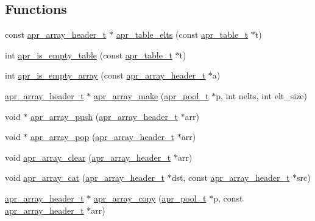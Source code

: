\subsection*{Functions}
\begin{DoxyCompactItemize}
\item 
const \hyperlink{structapr__array__header__t}{apr\-\_\-array\-\_\-header\-\_\-t} $\ast$ \hyperlink{group__apr__tables_gaea3005541cce67481f48ab201b5c0cf3}{apr\-\_\-table\-\_\-elts} (const \hyperlink{group__apr__tables_gad7ea82d6608a4a633fc3775694ab71e4}{apr\-\_\-table\-\_\-t} $\ast$t)
\item 
int \hyperlink{group__apr__tables_ga198e52683a86ecf8df9642990c220ff7}{apr\-\_\-is\-\_\-empty\-\_\-table} (const \hyperlink{group__apr__tables_gad7ea82d6608a4a633fc3775694ab71e4}{apr\-\_\-table\-\_\-t} $\ast$t)
\item 
int \hyperlink{group__apr__tables_gacae19f5b2182d5813f4ef3050f82ff29}{apr\-\_\-is\-\_\-empty\-\_\-array} (const \hyperlink{structapr__array__header__t}{apr\-\_\-array\-\_\-header\-\_\-t} $\ast$a)
\item 
\hyperlink{structapr__array__header__t}{apr\-\_\-array\-\_\-header\-\_\-t} $\ast$ \hyperlink{group__apr__tables_ga8f4308b5a1636ec06544113a9c283304}{apr\-\_\-array\-\_\-make} (\hyperlink{group__apr__pools_gaf137f28edcf9a086cd6bc36c20d7cdfb}{apr\-\_\-pool\-\_\-t} $\ast$p, int nelts, int elt\-\_\-size)
\item 
void $\ast$ \hyperlink{group__apr__tables_gac08267b32905197dd02ffff3314d9603}{apr\-\_\-array\-\_\-push} (\hyperlink{structapr__array__header__t}{apr\-\_\-array\-\_\-header\-\_\-t} $\ast$arr)
\item 
void $\ast$ \hyperlink{group__apr__tables_gad1ab3e0ca2de25a7ff2fbed393380972}{apr\-\_\-array\-\_\-pop} (\hyperlink{structapr__array__header__t}{apr\-\_\-array\-\_\-header\-\_\-t} $\ast$arr)
\item 
void \hyperlink{group__apr__tables_ga6a6436840256ed8a47b5d6be4ea2ae03}{apr\-\_\-array\-\_\-clear} (\hyperlink{structapr__array__header__t}{apr\-\_\-array\-\_\-header\-\_\-t} $\ast$arr)
\item 
void \hyperlink{group__apr__tables_ga532e0f0e4d1e2b7243ebdb7eb1f783c7}{apr\-\_\-array\-\_\-cat} (\hyperlink{structapr__array__header__t}{apr\-\_\-array\-\_\-header\-\_\-t} $\ast$dst, const \hyperlink{structapr__array__header__t}{apr\-\_\-array\-\_\-header\-\_\-t} $\ast$src)
\item 
\hyperlink{structapr__array__header__t}{apr\-\_\-array\-\_\-header\-\_\-t} $\ast$ \hyperlink{group__apr__tables_ga327e2d5e29fa49d5a2a31295a6932950}{apr\-\_\-array\-\_\-copy} (\hyperlink{group__apr__pools_gaf137f28edcf9a086cd6bc36c20d7cdfb}{apr\-\_\-pool\-\_\-t} $\ast$p, const \hyperlink{structapr__array__header__t}{apr\-\_\-array\-\_\-header\-\_\-t} $\ast$arr)

\end{DoxyCompactItemize}
